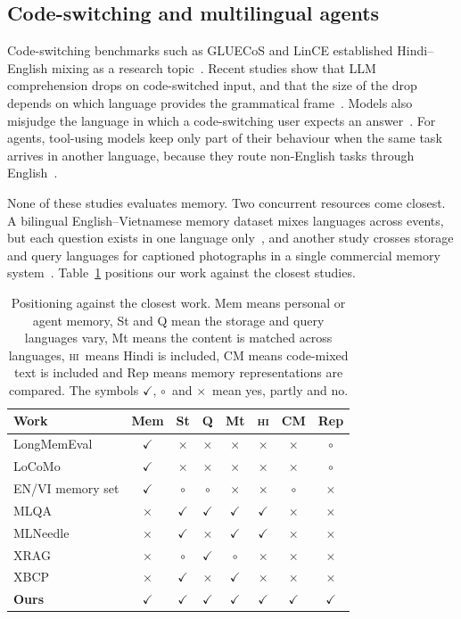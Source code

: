 \documentclass[11pt]{article}
\newcommand{\yes}{$\checkmark$}
\newcommand{\no}{$\times$}
\newcommand{\partly}{$\circ$}
\newcommand{\HI}{\textsc{hi}}
\begin{document}
\subsection{Code-switching and multilingual agents}
Code-switching benchmarks such as GLUECoS and LinCE established Hindi--English mixing as a research topic~\citep{khanuja2020gluecos,aguilar2020lince}.
Recent studies show that LLM comprehension drops on code-switched input, and that the size of the drop depends on which language provides the grammatical frame~\citep{mohamed2026lostinthemix}.
Models also misjudge the language in which a code-switching user expects an answer~\citep{oh2026ola}.
For agents, tool-using models keep only part of their behaviour when the same task arrives in another language, because they route non-English tasks through English~\citep{mukherjee2026policyretention}.

None of these studies evaluates memory.
Two concurrent resources come closest.
A bilingual English--Vietnamese memory dataset mixes languages across events, but each question exists in one language only~\citep{nguyendang2026lhmemory}, and another study crosses storage and query languages for captioned photographs in a single commercial memory system~\citep{kim2026wontopos}.
Table~\ref{tab:related} positions our work against the closest studies.

\begin{table}[t]
\centering\small\setlength{\tabcolsep}{3pt}
\begin{tabular}{lccccccc}
\toprule
Work & Mem & St & Q & Mt & \HI & CM & Rep \\
\midrule
LongMemEval & \yes & \no & \no & \no & \no & \no & \partly \\
LoCoMo & \yes & \no & \no & \no & \no & \no & \partly \\
EN/VI memory set & \yes & \partly & \partly & \no & \no & \partly & \no \\
MLQA & \no & \yes & \yes & \yes & \yes & \no & \no \\
MLNeedle & \no & \yes & \no & \yes & \yes & \no & \no \\
XRAG & \no & \partly & \yes & \partly & \no & \no & \no \\
XBCP & \no & \yes & \no & \yes & \no & \no & \no \\
\textbf{Ours} & \yes & \yes & \yes & \yes & \yes & \yes & \yes \\
\bottomrule
\end{tabular}
\caption{Positioning against the closest work. Mem means personal or agent memory, St and Q mean the storage and query languages vary, Mt means the content is matched across languages, \HI\ means Hindi is included, CM means code-mixed text is included and Rep means memory representations are compared. The symbols \yes, \partly\ and \no\ mean yes, partly and no.}
\label{tab:related}
\end{table}
\end{document}
